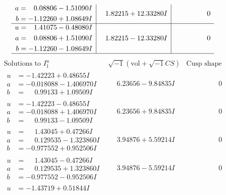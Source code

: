 \documentclass[1p]{elsarticle_modified}
\theoremstyle{definition}
\newcommand{\I}{\sqrt{-1}}
\begin{document}
$$\begin{array}{c|c|c}
\begin{aligned}
a &= \phantom{-}0.08806 - 1.51090 I \\
b &= -1.12260 + 1.08649 I\end{aligned}
 & \phantom{-}1.82215 + 12.33280 I & \phantom{-0.000000 } 0 \\ \hline\begin{aligned}
u &= \phantom{-}1.41075 - 0.48080 I \\
a &= \phantom{-}0.08806 + 1.51090 I \\
b &= -1.12260 - 1.08649 I\end{aligned}
 & \phantom{-}1.82215 - 12.33280 I & \phantom{-0.000000 } 0\\
 \hline 
 \end{array}$$\newpage$$\begin{array}{c|c|c}  
\text{Solutions to }I^u_{1}& \I (\text{vol} + \sqrt{-1}CS) & \text{Cusp shape}\\
 \hline 
\begin{aligned}
u &= -1.42223 + 0.48655 I \\
a &= -0.018088 - 1.406970 I \\
b &= \phantom{-}0.99133 + 1.09509 I\end{aligned}
 & \phantom{-}6.23656 - 9.84835 I & \phantom{-0.000000 } 0 \\ \hline\begin{aligned}
u &= -1.42223 - 0.48655 I \\
a &= -0.018088 + 1.406970 I \\
b &= \phantom{-}0.99133 - 1.09509 I\end{aligned}
 & \phantom{-}6.23656 + 9.84835 I & \phantom{-0.000000 } 0 \\ \hline\begin{aligned}
u &= \phantom{-}1.43045 + 0.47266 I \\
a &= \phantom{-}0.129535 - 1.323860 I \\
b &= -0.977552 + 0.952506 I\end{aligned}
 & \phantom{-}3.94876 + 5.59214 I & \phantom{-0.000000 } 0 \\ \hline\begin{aligned}
u &= \phantom{-}1.43045 - 0.47266 I \\
a &= \phantom{-}0.129535 + 1.323860 I \\
b &= -0.977552 - 0.952506 I\end{aligned}
 & \phantom{-}3.94876 - 5.59214 I & \phantom{-0.000000 } 0 \\ \hline\begin{aligned}
u &= -1.43719 + 0.51844 I \\

\end{aligned}
\end{array}$$
\end{document}
